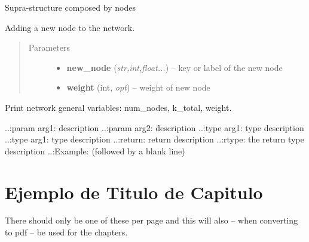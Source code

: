 \documentclass[letterpaper,10pt,english]{sphinxmanual}
\begin{document}

\begin{fulllineitems}
\label{networks:pyn_cl_net.net}
Supra-structure composed by nodes

\begin{fulllineitems}
\label{networks:pyn_cl_net.net.add_node}
Adding a new node to the network.
\begin{quote}\begin{description}
\item[{Parameters}] \leavevmode\begin{itemize}
\item {} 
\textbf{new\_node} (\emph{str,int,float...}) -- key or label of the new node

\item {} 
\textbf{weight} (int, \emph{opt}) -- weight of new node

\end{itemize}

\end{description}\end{quote}

\end{fulllineitems}


\begin{fulllineitems}
\label{networks:pyn_cl_net.net.info}
Print network general variables: num\_nodes, k\_total, weight.

\end{fulllineitems}


\end{fulllineitems}


..:param arg1: description
..:param arg2: description
..:type arg1: type description
..:type arg1: type description
..:return: return description
..:rtype: the return type description
..:Example: (followed by a blank line)


\chapter{Ejemplo de Titulo de Capitulo}
\label{example_edition_ex:ejemplo-de-titulo-de-capitulo}\label{example_edition_ex::doc}
There should only be one of these per page and this will also -- when
converting to pdf -- be used for the chapters.
\end{document}
